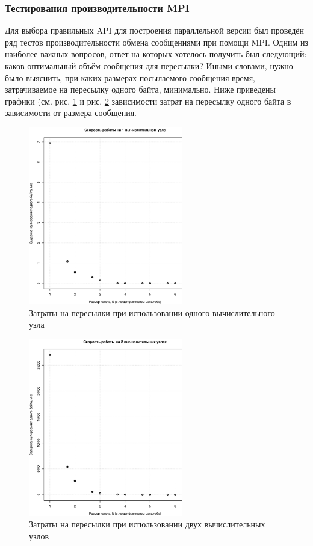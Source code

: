 \subsubsection{Тестирования производительности MPI}
Для выбора правильных API для построения параллельной версии был проведён ряд тестов производительности обмена сообщениями при помощи MPI. Одним из наиболее важных вопросов, ответ на которых хотелось получить был следующий: каков оптимальный объём сообщения для пересылки? Иными словами, нужно было выяснить, при каких размерах посылаемого сообщения время, затрачиваемое на пересылку одного байта, минимально.
Ниже приведены графики (см. рис. \ref{pic:mpi1host} и рис. \ref{pic:mpi2hosts} зависимости затрат на пересылку одного байта в зависимости от размера сообщения.
\begin{figure}[htp]
\centering
\includegraphics[width=0.6\textwidth]{eps/mpi-1host.eps}
\caption{Затраты на пересылки при использовании одного вычислительного
 узла}
\label{pic:mpi1host}
\end{figure}
\begin{figure}[htp]
\centering
\includegraphics[width=0.6\textwidth]{eps/mpi-2hosts.eps}
\caption{Затраты на пересылки при использовании двух вычислительных узлов}
\label{pic:mpi2hosts}
\end{figure}
